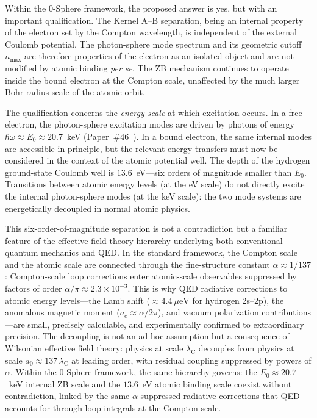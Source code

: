 \documentclass[%
 reprint, amsmath,amssymb, aps, prb, ]{revtex4-2}
\numberwithin{equation}{section}
\newcommand{\lambdaC}{\lambda_{\mathrm{C}}}
\begin{document}
Within the 0-Sphere framework, the proposed answer is yes, but with an important qualification. The Kernel A--B separation, being an internal property of the electron set by the Compton wavelength, is independent of the external Coulomb potential. The photon-sphere mode spectrum and its geometric cutoff $n_{\max}$ are therefore properties of the electron as an isolated object and are not modified by atomic binding \emph{per se}. The ZB mechanism continues to operate inside the bound electron at the Compton scale, unaffected by the much larger Bohr-radius scale of the atomic orbit.

The qualification concerns the \emph{energy scale} at which excitation occurs. In a free electron, the photon-sphere excitation modes are driven by photons of energy $\hbar\omega \approx E_0 \approx 20.7$~keV (Paper~\#46~\cite{hanamura46}). In a bound electron, the same internal modes are accessible in principle, but the relevant energy transfers must now be considered in the context of the atomic potential well. The depth of the hydrogen ground-state Coulomb well is $13.6$~eV---six orders of magnitude smaller than $E_0$. Transitions between atomic energy levels (at the eV scale) do not directly excite the internal photon-sphere modes (at the keV scale): the two mode systems are energetically decoupled in normal atomic physics.

This six-order-of-magnitude separation is not a contradiction but a familiar feature of the effective field theory hierarchy underlying both conventional quantum mechanics and QED. In the standard framework, the Compton scale and the atomic scale are connected through the fine-structure constant $\alpha \approx 1/137$: Compton-scale loop corrections enter atomic-scale observables suppressed by factors of order $\alpha/\pi \approx 2.3\times10^{-3}$. This is why QED radiative corrections to atomic energy levels---the Lamb shift ($\approx 4.4~\mu\text{eV}$ for hydrogen 2s--2p), the anomalous magnetic moment ($a_e \approx \alpha/2\pi$), and vacuum polarization contributions---are small, precisely calculable, and experimentally confirmed to extraordinary precision. The decoupling is not an ad hoc assumption but a consequence of Wilsonian effective field theory: physics at scale $\lambdaC$ decouples from physics at scale $a_0 \approx 137\,\lambdaC$ at leading order, with residual coupling suppressed by powers of $\alpha$. Within the 0-Sphere framework, the same hierarchy governs: the $E_0 \approx 20.7$~keV internal ZB scale and the $13.6$~eV atomic binding scale coexist without contradiction, linked by the same $\alpha$-suppressed radiative corrections that QED accounts for through loop integrals at the Compton scale.
\end{document}
